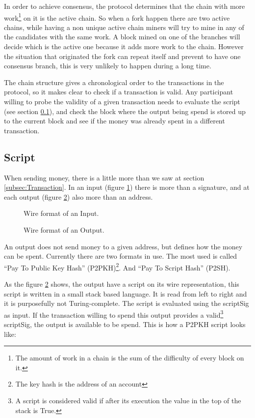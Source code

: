 In order to achieve consensus, the protocol determines that the chain with
  more work\footnote{The amount of work in a chain is the sum of the difficulty
  of every block on it.} on it is the active chain.
So when a fork happen there are two active chains, while having a non unique
  active chain miners will try to mine in any of the candidates with the same
  work.
A block mined on one of the branches will decide which is the active one
  because it adds more work to the chain. However the situation that originated
  the fork can repeat itself and prevent to have one consensus branch, this is
  very unlikely\cite{decker2013information} to happen during a long time.

The chain structure gives a chronological order to the transactions in the
  protocol, so it makes clear to check if a transaction is valid.
Any participant willing to probe the validity of a given transaction needs
  to evaluate the script (see section \ref{subsec:script}), and  check the block
  where the output being spend is stored up to the current block and see if the
  money was already spent in a different transaction.

  \subsection{Script} \label{subsec:script}

When sending money, there is a little more than we saw at section
  \ref{subsec:Transaction}. In an input (figure \ref{fig:input}) there is more
  than a signature, and at each output (figure \ref{fig:output}) also more than
  an address.

\begin{figure}[ht]
  \centering
  
  \caption{Wire format of an Input.}
  \label{fig:input}
\end{figure}

\begin{figure}[ht]
  \centering
  
  \caption{Wire format of an Output.}
  \label{fig:output}
\end{figure}

An output does not send money to a given address, but defines how the money can
  be spent. Currently there are two formats in use. The most used is called
  ``Pay To Public Key Hash'' (P2PKH)\footnote{The key hash is the address of an
  account}. And ``Pay To Script Hash'' (P2SH).

As the figure \ref{fig:output} shows, the output have a script on its wire
  representation, this script is written in a small stack based language.
It is read from left to right and it is purposefully not Turing-complete.
The script is evaluated using the scriptSig as input. If the transaction willing
  to spend this output provides a valid\footnote{A script is considered valid
  if after its execution the value in the top of the stack is True.} scriptSig,
  the output is available to be spend. This is how a P2PKH script looks like:

